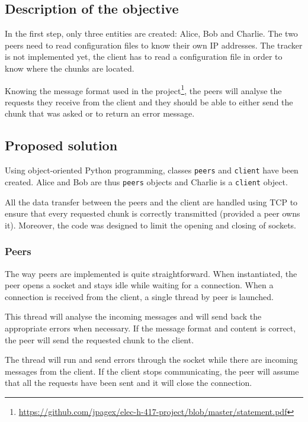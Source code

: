 \subsection{Description of the objective}

In the first step, only three entities are created: Alice, Bob and Charlie. The two peers need to read configuration files to know their own IP addresses. The tracker is not implemented yet, the client has to read a configuration file in order to know where the chunks are located.

Knowing the message format used in the project\footnote{\url{https://github.com/jpagex/elec-h-417-project/blob/master/statement.pdf}}, the peers will analyse the requests they receive from the client and they should be able to either send the chunk that was asked or to return an error message.

\subsection{Proposed solution}

Using object-oriented Python programming, classes \texttt{peers} and \texttt{client} have been created. Alice and Bob are thus \texttt{peers} objects and Charlie is a \texttt{client} object.

All the data transfer between the peers and the client are handled using TCP to ensure that every requested chunk is correctly transmitted (provided a peer owns it). Moreover, the code was designed to limit the opening and closing of sockets.

\subsubsection{Peers}

The way peers are implemented is quite straightforward. When instantiated, the peer opens a socket and stays idle while waiting for a connection. When a connection is received from the client, a single thread by peer is launched.

This thread will analyse the incoming messages and will send back the appropriate errors when necessary. If the message format and content is correct, the peer will send the requested chunk to the client.

The thread will run and send errors through the socket while there are incoming messages from the client. If the client stops communicating, the peer will assume that all the requests have been sent and it will close the connection.

